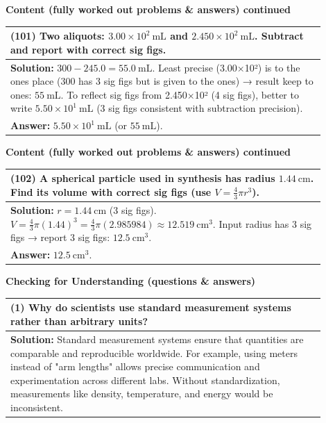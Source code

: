 \documentclass{article}
\begin{document}
\noindent
{\large \textbf{Content (fully worked out problems \& answers) continued}} \\[0.2em]
\begin{tabular}{|p{0.9\linewidth}|}
\hline
\vspace{0.2cm}
\textbf{(101)} Two aliquots: $3.00\times10^{2}~\text{mL}$ and $2.450\times10^{2}~\text{mL}$. Subtract and report with correct sig figs. \\
\hline
\vspace{0.2cm}
\textbf{Solution:} $300-245.0=55.0~\text{mL}$. Least precise (3.00×10²) is to the ones place (300 has 3 sig figs but is given to the ones) → result keep to ones: $55~\text{mL}$. To reflect sig figs from 2.450×10² (4 sig figs), better to write $5.50\times10^{1}~\text{mL}$ (3 sig figs consistent with subtraction precision). \\
\textbf{Answer:} $5.50\times10^{1}~\text{mL}$ (or $55~\text{mL}$). \\
\hline
\end{tabular}
\newpage

\noindent
{\large \textbf{Content (fully worked out problems \& answers) continued}} \\[0.2em]
\begin{tabular}{|p{0.9\linewidth}|}
\hline
\vspace{0.2cm}
\textbf{(102)} A spherical particle used in synthesis has radius $1.44~\text{cm}$. Find its volume with correct sig figs (use $V=\tfrac{4}{3}\pi r^3$). \\
\hline
\vspace{0.2cm}
\textbf{Solution:} $r=1.44~\text{cm}$ (3 sig figs). $V=\tfrac{4}{3}\pi(1.44)^3= \tfrac{4}{3}\pi(2.985984)\approx12.519\ \text{cm}^3$. Input radius has 3 sig figs → report 3 sig figs: $12.5~\text{cm}^3$. \\
\textbf{Answer:} $12.5~\text{cm}^3$. \\
\hline
\end{tabular}
\newpage

\newpage
\noindent
{\large \textbf{Checking for Understanding (questions \& answers)}}

\begin{tabular}{|p{0.9\linewidth}|}
\hline
\textbf{(1) Why do scientists use standard measurement systems rather than arbitrary units?} \\ \hline
\textbf{Solution:} Standard measurement systems ensure that quantities are comparable and reproducible worldwide. For example, using meters instead of "arm lengths" allows precise communication and experimentation across different labs. Without standardization, measurements like density, temperature, and energy would be inconsistent. \\ \hline
\end{tabular}
\newpage
\end{document}
